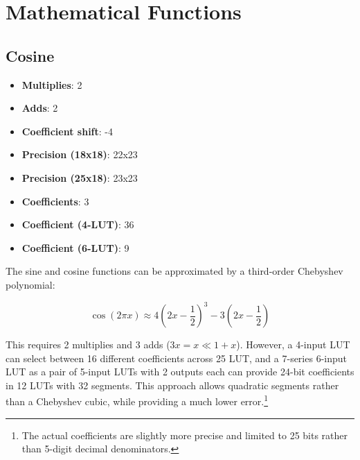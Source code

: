 
\chapter{Mathematical Functions}

\section{Cosine}

\begin{itemize}
	\item \textbf{Multiplies}:  2
	\item \textbf{Adds}: 2
	\item \textbf{Coefficient shift}:  -4
	\item \textbf{Precision (18x18)}:  22x23
	\item \textbf{Precision (25x18)}:  23x23
	\item \textbf{Coefficients}:  3
	\item \textbf{Coefficient (4-LUT)}: 36
	\item \textbf{Coefficient (6-LUT)}: 9
\end{itemize}

The sine and cosine functions can be approximated by a third-order Chebyshev polynomial:

\begin{equation*}
	\cos\left(2\pi x\right)\approx4\left(2x-\frac{1}{2}\right)^{3}-3\left(2x-\frac{1}{2}\right)
\end{equation*}

This requires 2 multiplies and 3 adds ($3x=x\ll1+x$).  However, a 4-input LUT can select between 16 different coefficients across 25 LUT, and a 7-series 6-input LUT as a pair of 5-input LUTs with 2 outputs each can provide 24-bit coefficients in 12 LUTs with 32 segments.  This approach allows quadratic segments rather than a Chebyshev cubic, while providing a much lower error.\footnote{The actual coefficients are slightly more precise and limited to 25 bits rather than 5-digit decimal denominators.}

